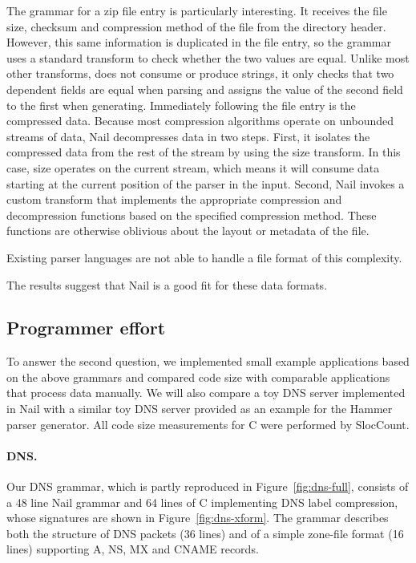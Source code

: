 The  grammar for a zip file entry is particularly interesting. It receives the file
size, checksum and compression method of the file from the directory header. However, this same
information is duplicated in the file entry, so the grammar uses a standard 
transform to check whether the two values are equal. Unlike most other transforms, 
does not consume or produce strings, it only checks that two dependent fields are equal when parsing
and assigns the value of the second field to the first when generating. Immediately following the
file entry is the compressed data. Because most compression algorithms operate on unbounded streams
of data, Nail decompresses data in two steps.
First, it isolates the compressed data from the rest of the stream by using the size transform. In
this case, size operates on the current stream, which means it will consume data starting at the
current position of the parser in the input.
Second, Nail invokes a custom transform that implements the appropriate compression and decompression
functions based on the specified compression method. These functions are otherwise oblivious about
the layout or metadata of the file.

Existing parser languages are not able to handle a file format of this complexity.

\noindent The results suggest that Nail is a good fit for these data formats. 



\subsection{Programmer effort}


\label{s:eval-effort}
To answer the second question, we implemented small example applications based on the above
grammars and compared code size with comparable applications that process data manually. We will
also compare a toy DNS server implemented in Nail with a similar toy DNS server provided as an
example for the Hammer parser generator. All code size measurements for C were performed by
SlocCount\cite{sloccount}.

\paragraph{DNS.}

Our DNS grammar, which is partly reproduced in Figure~\ref{fig:dns-full}, consists of a 48 line Nail
grammar and 64 lines of C implementing DNS label compression, whose signatures are shown in
Figure~\ref{fig:dns-xform}.
The grammar describes both the structure of DNS packets (36 lines) and of a simple zone-file format
(16 lines) supporting A, NS, MX and CNAME records. 

